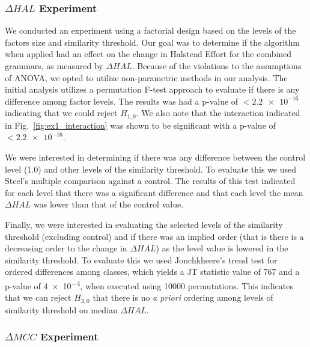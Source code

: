 \documentclass[conference]{IEEEtran}
\begin{document}
\hypertarget{delta-hal-experiment}{%
\subsubsection{\texorpdfstring{\(\Delta HAL\)
Experiment}{\textbackslash Delta HAL Experiment}}\label{delta-hal-experiment}}

We conducted an experiment using a factorial design based on the levels
of the factors size and similarity threshold. Our goal was to determine
if the algorithm when applied had an effect on the change in Halstead
Effort for the combined grammars, as measured by \(\Delta HAL\). Because
of the violations to the assumptions of ANOVA, we opted to utilize
non-parametric methods in our analysis. The initial analysis utilizes a
permutation F-test approach to evaluate if there is any difference among
factor levels. The results was had a p-value of \(<\num{2.2e-16}\)
indicating that we could reject \(H_{1,0}\). We also note that the
interaction indicated in Fig.~\ref{fig:ex1_interaction} was shown to be
significant with a p-value of \(<\num{2.2e-16}\).

We were interested in determining if there was any difference between
the control level (1.0) and other levels of the similarity threshold. To
evaluate this we used Steel's multiple comparison against a control. The
results of this test indicated for each level that there was a
significant difference and that each level the mean \(\Delta HAL\) was
lower than that of the control value.

Finally, we were interested in evaluating the selected levels of the
similarity threshold (excluding control) and if there was an implied
order (that is there is a decreasing order to the change in
\(\Delta HAL\)) as the level value is lowered in the similarity
threshold. To evaluate this we used Jonchkheere's trend test for ordered
differences among classes, which yields a JT statistic value of 767 and
a p-value of \num{4e-4}, when executed using 10000 permutations. This
indicates that we can reject \(H_{3,0}\) that there is no \emph{a
priori} ordering among levels of similarity threshold on median
\(\Delta HAL\).

\hypertarget{delta-mcc-experiment}{%
\subsubsection{\texorpdfstring{\(\Delta MCC\)
Experiment}{\textbackslash Delta MCC Experiment}}\label{delta-mcc-experiment}}
\end{document}
